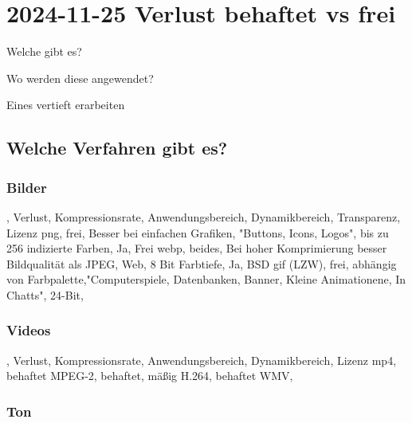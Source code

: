 \section{2024-11-25 Verlust behaftet vs frei}

\startitemize[packed]
\item Welche gibt es?
\item Wo werden diese angewendet?
\item Eines vertieft erarbeiten
\stopitemize

\subsection{Welche Verfahren gibt es?}


\subsubsection{Bilder}

\startframedtext[width=\dimexpr\textwidth+\rightmarginwidth+\rightmargindistance\relax,frame=off,offset=none] %
\startplacetable[location={here},title={}]
\setupTABLE[c][1][background=color,backgroundcolor=gray]
\setupTABLE[r][1][background=color,backgroundcolor=gray]
\bTABLE[option=stratch,offset=1mm]
\startCSV
[background=DiagonalRule] , Verlust, Kompressionsrate, Anwendungsbereich, Dynamikbereich, Transparenz, Lizenz
png, frei, Besser bei einfachen Grafiken, "Buttons, Icons, Logos", bis zu 256 indizierte Farben, Ja, Frei
webp, beides, Bei hoher Komprimierung besser Bildqualität als JPEG, Web, 8 Bit Farbtiefe, Ja, BSD
gif (LZW), frei, abhängig von Farbpalette,"Computerspiele, Datenbanken, Banner, Kleine Animationene, In Chatts", 24-Bit,
\stopCSV
\eTABLE
\stopplacetable
\stopframedtext

\subsubsection{Videos}

\startplacetable[location={here},title={}]
\setupTABLE[c][1][background=color,backgroundcolor=gray]
\setupTABLE[r][1][background=color,backgroundcolor=gray]
\bTABLE[option=stratch,offset=1mm]
\startCSV
[background=DiagonalRule] , Verlust, Kompressionsrate, Anwendungsbereich, Dynamikbereich, Lizenz
mp4, behaftet
MPEG-2, behaftet, mäßig
H.264, behaftet
WMV,
\stopCSV
\eTABLE
\stopplacetable

\subsubsection{Ton}

